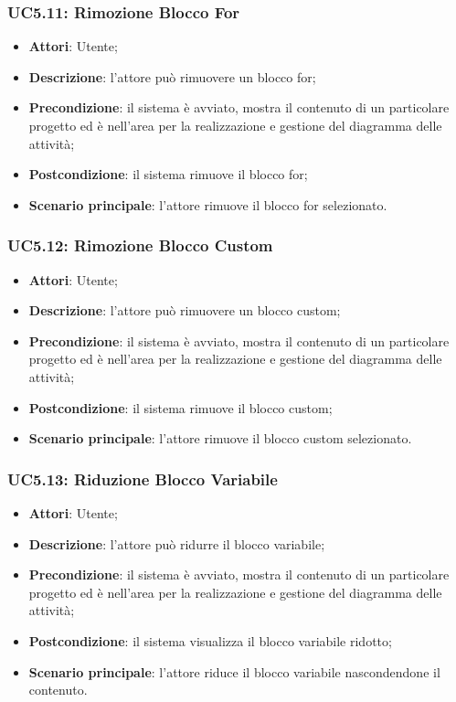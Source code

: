 \subsubsection{UC5.11: Rimozione Blocco For}
\label{UC5.11}
\begin{itemize}
	\item \textbf{Attori}: Utente;
	\item \textbf{Descrizione}: l'attore può rimuovere un blocco for;
	\item \textbf{Precondizione}: il sistema è avviato, mostra il contenuto di un particolare progetto ed è nell'area per la realizzazione e gestione del diagramma delle attività;
	\item \textbf{Postcondizione}: il sistema rimuove il blocco for;
	\item \textbf{Scenario principale}: l'attore rimuove il blocco for selezionato.
\end{itemize}

\subsubsection{UC5.12: Rimozione Blocco Custom}
\label{UC5.12}
\begin{itemize}
	\item \textbf{Attori}: Utente;
	\item \textbf{Descrizione}: l'attore può rimuovere un blocco custom;
	\item \textbf{Precondizione}: il sistema è avviato, mostra il contenuto di un particolare progetto ed è nell'area per la realizzazione e gestione del diagramma delle attività;
	\item \textbf{Postcondizione}: il sistema rimuove il blocco custom;
	\item \textbf{Scenario principale}: l'attore rimuove il blocco custom selezionato.
\end{itemize}

\subsubsection{UC5.13: Riduzione Blocco Variabile}
\label{UC5.13}
\begin{itemize}
	\item \textbf{Attori}: Utente;
	\item \textbf{Descrizione}: l'attore può ridurre il blocco variabile;
	\item \textbf{Precondizione}: il sistema è avviato, mostra il contenuto di un particolare progetto ed è nell'area per la realizzazione e gestione del diagramma delle attività;
	\item \textbf{Postcondizione}: il sistema visualizza il blocco variabile ridotto;
	\item \textbf{Scenario principale}: l'attore riduce il blocco variabile nascondendone il contenuto.
\end{itemize}

